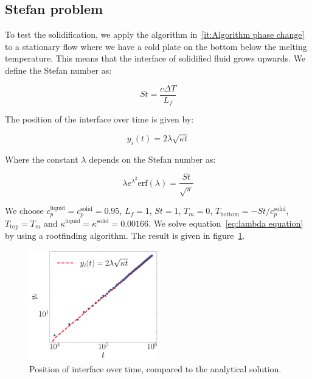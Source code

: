 \subsection{Stefan problem}
To test the solidification, we apply the algorithm in~\ref{it:Algorithm phase change} to a stationary flow where we have a cold plate on the bottom below the melting temperature. This means that the interface of solidified fluid grows upwards. We define the Stefan number as:

\begin{equation}
    \textit{St} = \frac{c \Delta T}{L_f}
\end{equation}

The position of the interface over time is given by:

\begin{equation}
    y_i(t) = 2 \lambda \sqrt{\kappa t}
\end{equation}

Where the constant $\lambda$ depends on the Stefan number as:

\begin{equation}\label{eq:lambda equation}
    \lambda e^{\lambda^2} \text{erf}(\lambda) = \frac{\textit{St}}{\sqrt{\pi}}
\end{equation}

We choose $c_p^{\text{liquid}} = c_p^{\text{solid}} = 0.95$, $L_f = 1$, $\textit{St} = 1$, $T_m = 0$, $T_{\text{bottom}} = -\textit{St}/c_p^{\text{solid}}$, $T_{\text{top}} = T_m$ and $\kappa^{\text{liquid}} = \kappa^{\text{solid}} = 0.00166$. We solve equation~\ref{eq:lambda equation} by using a rootfinding algorithm. The result is given in figure~\ref{fig:stefan}.

\begin{figure}[htp]
    \centering
    \includegraphics[width=0.5\textwidth]{figures/stefan.pdf}
    \caption{Position of interface over time, compared to the analytical solution.}\label{fig:stefan}
\end{figure}

